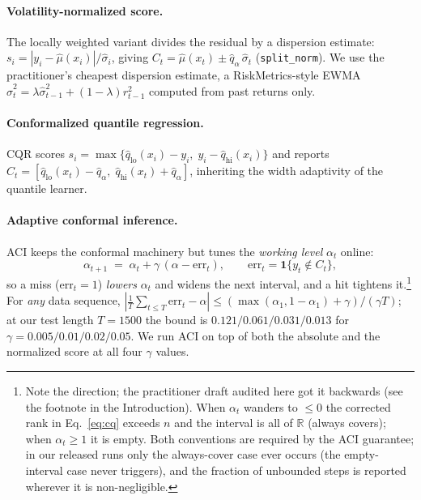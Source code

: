 \documentclass[11pt]{article}
\newcommand{\err}{\mathrm{err}}
\newcommand{\qhat}{\hat{q}}
\begin{document}
\paragraph{Volatility-normalized score.} The locally weighted variant
\citep{lei2018distribution} divides the residual by a dispersion estimate:
$s_i=|y_i-\hat\mu(x_i)|/\hat\sigma_i$, giving
$C_t=\hat\mu(x_t)\pm \qhat_\alpha\,\hat\sigma_t$ (\texttt{split\_norm}). We
use the practitioner's cheapest dispersion estimate, a RiskMetrics-style EWMA
$\hat\sigma_t^2=\lambda\hat\sigma_{t-1}^2+(1-\lambda)r_{t-1}^2$ computed from
past returns only.

\paragraph{Conformalized quantile regression.} CQR
\citep{romano2019conformalized} scores
$s_i=\max\{\hat{q}_{\mathrm{lo}}(x_i)-y_i,\;y_i-\hat{q}_{\mathrm{hi}}(x_i)\}$
and reports
$C_t=[\hat{q}_{\mathrm{lo}}(x_t)-\qhat_\alpha,\;\hat{q}_{\mathrm{hi}}(x_t)+\qhat_\alpha]$,
inheriting the width adaptivity of the quantile learner.

\paragraph{Adaptive conformal inference.} ACI \citep{gibbs2021adaptive} keeps
the conformal machinery but tunes the \emph{working level} $\alpha_t$ online:
\begin{equation}
\alpha_{t+1} \;=\; \alpha_t + \gamma\,(\alpha - \err_t),
\qquad
\err_t = \mathbf{1}\{y_t \notin C_t\},
\label{eq:aci}
\end{equation}
so a miss ($\err_t=1$) \emph{lowers} $\alpha_t$ and widens the next interval,
and a hit tightens it.\footnote{Note the direction; the practitioner draft
audited here got it backwards (see the footnote in the Introduction). When
$\alpha_t$ wanders to $\le 0$ the corrected rank in Eq.~\eqref{eq:cq} exceeds
$n$ and the interval is all of $\mathbb{R}$ (always covers); when
$\alpha_t\ge 1$ it is empty. Both conventions are required by the ACI
guarantee; in our released runs only the always-cover case ever occurs (the
empty-interval case never triggers), and the fraction of unbounded steps is
reported wherever it is non-negligible.} For \emph{any} data sequence,
$|\frac{1}{T}\sum_{t\le T}\err_t-\alpha|\le
(\max(\alpha_1,1-\alpha_1)+\gamma)/(\gamma T)$; at our test length $T=1500$
the bound is $0.121/0.061/0.031/0.013$ for
$\gamma=0.005/0.01/0.02/0.05$. We run ACI on top of both the absolute and the
normalized score at all four $\gamma$ values.
\end{document}
